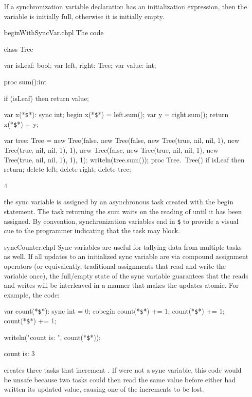If a synchronization variable declaration has an initialization
expression, then the variable is initially full, otherwise it is
initially empty.

\begin{chapelexample}{beginWithSyncVar.chpl}
The code
\begin{chapel}
class Tree {
  var isLeaf: bool;
  var left, right: Tree;
  var value: int;

  proc sum():int {
    if (isLeaf) then 
       return value;

    var x(*\texttt{\$}*): sync int;
    begin x(*\texttt{\$}*) = left.sum();
    var y = right.sum();
    return x(*\texttt{\$}*) + y;
  }
}
\end{chapel}
\begin{chapelpost}
var tree: Tree = new Tree(false, new Tree(false, new Tree(true, nil, nil, 1),
                                                 new Tree(true, nil, nil, 1), 1),
                                 new Tree(false, new Tree(true, nil, nil, 1),
                                                 new Tree(true, nil, nil, 1), 1), 1);
writeln(tree.sum());
proc Tree.~Tree() {
  if isLeaf then return;
  delete left;
  delete right;
}
delete tree;
\end{chapelpost}
\begin{chapeloutput}
4
\end{chapeloutput}
the sync variable  is assigned by an
asynchronous task created with the begin statement.  The task
returning the sum waits on the reading of 
until it has been assigned.  By convention, synchronization variables
end in \texttt{\$} to provide a visual cue to the programmer
indicating that the task may block.
\end{chapelexample}

\begin{chapelexample}{syncCounter.chpl}
Sync variables are useful for tallying data from multiple tasks as
well.  If all updates to an initialized sync variable are via compound
assignment operators (or equivalently, traditional assignments that
read and write the variable once), the full/empty state of the sync
variable guarantees that the reads and writes will be interleaved
in a manner that makes the updates atomic.  For example, the code:
\begin{chapel}
var count(*\texttt{\$}*): sync int = 0;
cobegin {
  count(*\texttt{\$}*) += 1;
  count(*\texttt{\$}*) += 1;
  count(*\texttt{\$}*) += 1;
}
\end{chapel}
\begin{chapelpost}
writeln("count is: ", count(*\texttt{\$}*));
\end{chapelpost}
\begin{chapeloutput}
count is: 3
\end{chapeloutput}
creates three tasks that increment .
If  were not a sync variable, this code
would be unsafe because two tasks could then read the same value
before either had written its updated value, causing one of the
increments to be lost.
\end{chapelexample}

